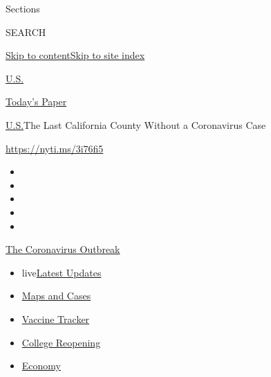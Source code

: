 Sections

SEARCH

\protect\hyperlink{site-content}{Skip to
content}\protect\hyperlink{site-index}{Skip to site index}

\href{https://www.nytimes.com/section/us}{U.S.}

\href{https://myaccount.nytimes.com/auth/login?response_type=cookie\&client_id=vi}{}

\href{https://www.nytimes.com/section/todayspaper}{Today's Paper}

\href{/section/us}{U.S.}\textbar{}The Last California County Without a
Coronavirus Case

\url{https://nyti.ms/3i76fi5}

\begin{itemize}
\item
\item
\item
\item
\item
\end{itemize}

\href{https://www.nytimes.com/news-event/coronavirus?action=click\&pgtype=Article\&state=default\&region=TOP_BANNER\&context=storylines_menu}{The
Coronavirus Outbreak}

\begin{itemize}
\tightlist
\item
  live\href{https://www.nytimes.com/2020/08/03/world/coronavirus-covid-19.html?action=click\&pgtype=Article\&state=default\&region=TOP_BANNER\&context=storylines_menu}{Latest
  Updates}
\item
  \href{https://www.nytimes.com/interactive/2020/us/coronavirus-us-cases.html?action=click\&pgtype=Article\&state=default\&region=TOP_BANNER\&context=storylines_menu}{Maps
  and Cases}
\item
  \href{https://www.nytimes.com/interactive/2020/science/coronavirus-vaccine-tracker.html?action=click\&pgtype=Article\&state=default\&region=TOP_BANNER\&context=storylines_menu}{Vaccine
  Tracker}
\item
  \href{https://www.nytimes.com/2020/08/02/us/covid-college-reopening.html?action=click\&pgtype=Article\&state=default\&region=TOP_BANNER\&context=storylines_menu}{College
  Reopening}
\item
  \href{https://www.nytimes.com/live/2020/08/03/business/stock-market-today-coronavirus?action=click\&pgtype=Article\&state=default\&region=TOP_BANNER\&context=storylines_menu}{Economy}
\end{itemize}

